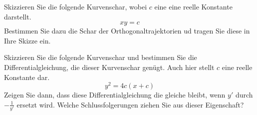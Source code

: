 \begin{atiTask}[
	title = Orthogonaltrajektorien
]
	\begin{atiSubtasks}
		\item {
			Skizzieren Sie die folgende Kurvenschar, wobei $c$ eine eine reelle Konstante darstellt.
			\[
				xy = c
			\]
			Bestimmen Sie dazu die Schar der Orthogonaltrajektorien ud tragen Sie diese in Ihre Skizze ein.
		}
		\item{
			Skizzieren Sie die folgende Kurvenschar und bestimmen Sie die Differentialgleichung, die dieser Kurvenschar genügt.
			Auch hier stellt $c$ eine reelle Konstante dar.
			\[
				y^2 = 4c(x+c)
			\]
			Zeigen Sie dann, dass diese Differentialgleichung die gleiche bleibt, wenn $y'$ durch $-\frac{1}{y'}$ ersetzt wird.
			Welche Schlussfolgerungen ziehen Sie aus dieser Eigenschaft?
		}
	\end{atiSubtasks}
\end{atiTask}